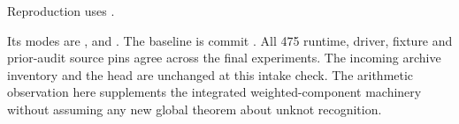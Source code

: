 

Reproduction uses .

Its modes are ,  and . The
baseline is commit . All 475 runtime, driver, fixture and
prior-audit source pins agree across the final experiments. The incoming
archive inventory and the  head  are
unchanged at this intake check. The arithmetic observation here supplements
the integrated weighted-component machinery without assuming any new
global theorem about unknot recognition.
